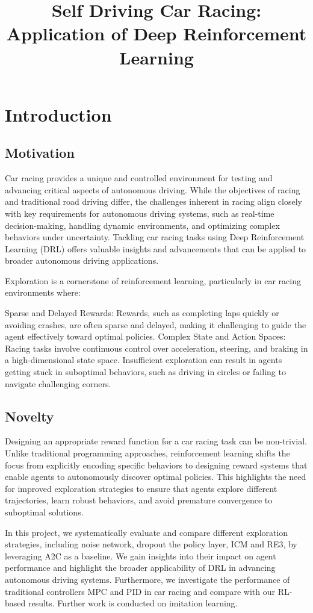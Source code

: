 \documentclass{article}
\title{Self Driving Car Racing: Application of Deep Reinforcement Learning}
\author{}
\begin{document}
\section{Introduction}
\subsection{Motivation}
Car racing provides a unique and controlled environment for testing and advancing critical aspects of autonomous driving. While the objectives of racing and traditional road driving differ, the challenges inherent in racing align closely with key requirements for autonomous driving systems, such as real-time decision-making, handling dynamic environments, and optimizing complex behaviors under uncertainty. Tackling car racing tasks using Deep Reinforcement Learning (DRL) offers valuable insights and advancements that can be applied to broader autonomous driving applications.

Exploration is a cornerstone of reinforcement learning, particularly in car racing environments where:

Sparse and Delayed Rewards: Rewards, such as completing laps quickly or avoiding crashes, are often sparse and delayed, making it challenging to guide the agent effectively toward optimal policies.
Complex State and Action Spaces: Racing tasks involve continuous control over acceleration, steering, and braking in a high-dimensional state space. Insufficient exploration can result in agents getting stuck in suboptimal behaviors, such as driving in circles or failing to navigate challenging corners.

\subsection{Novelty}
Designing an appropriate reward function for a car racing task can be non-trivial. Unlike traditional programming approaches, reinforcement learning shifts the focus from explicitly encoding specific behaviors to designing reward systems that enable agents to autonomously discover optimal policies. This highlights the need for improved exploration strategies to ensure that agents explore different trajectories, learn robust behaviors, and avoid premature convergence to suboptimal solutions.

In this project, we systematically evaluate and compare different exploration strategies, including noise network, dropout the policy layer, ICM and RE3, by leveraging A2C as a baseline. We gain insights into their impact on agent performance and highlight the broader applicability of DRL in advancing autonomous driving systems. Furthermore, we investigate the performance of traditional controllers MPC and PID in car racing and compare with our RL-based results. Further work is conducted on imitation learning.
\end{document}
